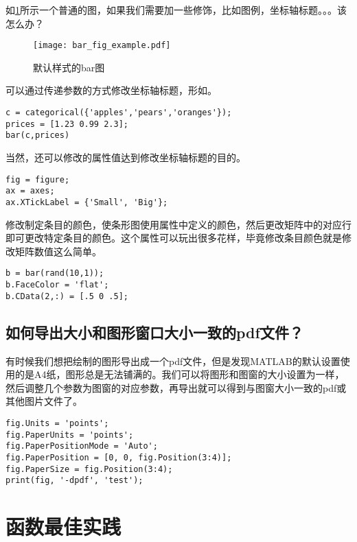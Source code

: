 如\ref{bar_fig_example}所示一个普通的图，如果我们需要加一些修饰，比如图例，坐标轴标题。。。该怎么办？

\begin{figure}
    \centering
    \texttt{[image: bar\_fig\_example.pdf]}
    \caption{默认样式的bar图}
    \label{bar_fig_example}
\end{figure}

可以通过传递参数的方式修改坐标轴标题，形如。

\begin{verbatim}
c = categorical({'apples','pears','oranges'});
prices = [1.23 0.99 2.3];
bar(c,prices)
\end{verbatim}

当然，还可以修改的属性值达到修改坐标轴标题的目的。

\begin{verbatim}
fig = figure;
ax = axes;
ax.XTickLabel = {'Small', 'Big'};
\end{verbatim}

修改制定条目的颜色，使条形图使用属性中定义的颜色，然后更改矩阵中的对应行即可更改特定条目的颜色。这个属性可以玩出很多花样，毕竟修改条目颜色就是修改矩阵数值这么简单。

\begin{verbatim}
b = bar(rand(10,1));
b.FaceColor = 'flat';
b.CData(2,:) = [.5 0 .5];
\end{verbatim}

\subsection{如何导出大小和图形窗口大小一致的pdf文件？}

有时候我们想把绘制的图形导出成一个pdf文件，但是发现MATLAB的默认设置使用的是A4纸，图形总是无法铺满的。我们可以将图形和图窗的大小设置为一样，然后调整几个参数为图窗的对应参数，再导出就可以得到与图窗大小一致的pdf或其他图片文件了。

\begin{verbatim}
fig.Units = 'points';
fig.PaperUnits = 'points';
fig.PaperPositionMode = 'Auto';
fig.PaperPosition = [0, 0, fig.Position(3:4)];
fig.PaperSize = fig.Position(3:4);
print(fig, '-dpdf', 'test');
\end{verbatim}

\section{函数最佳实践}

